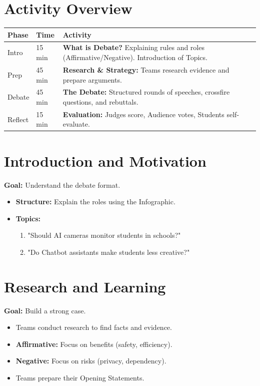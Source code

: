 \documentclass[11pt, a4paper]{article}
\begin{document}
\section*{Activity Overview}
\begingroup
\small
\begin{tabularx}{\textwidth}{|l|l|L|}
    \hline
     \textbf{Phase} & \textbf{Time} & \textbf{Activity} \\ \hline
    Intro & 15 min & \textbf{What is Debate?} Explaining rules and roles (Affirmative/Negative). Introduction of Topics. \\ \hline
    Prep & 45 min & \textbf{Research \& Strategy:} Teams research evidence and prepare arguments. \\ \hline
    Debate & 45 min & \textbf{The Debate:} Structured rounds of speeches, crossfire questions, and rebuttals. \\ \hline
    Reflect & 15 min & \textbf{Evaluation:} Judges score, Audience votes, Students self-evaluate. \\ \hline
\end{tabularx}
\endgroup

\section{Introduction and Motivation}
\textbf{Goal:} Understand the debate format.
\begin{itemize}
    \item \textbf{Structure:} Explain the roles using the Infographic.
    \item \textbf{Topics:}
    \begin{enumerate}
        \item "Should AI cameras monitor students in schools?"
        \item "Do Chatbot assistants make students less creative?"
    \end{enumerate}
\end{itemize}

\section{Research and Learning}
\textbf{Goal:} Build a strong case.
\begin{itemize}
    \item Teams conduct research to find facts and evidence.
    \item \textbf{Affirmative:} Focus on benefits (safety, efficiency).
    \item \textbf{Negative:} Focus on risks (privacy, dependency).
    \item Teams prepare their Opening Statements.
\end{itemize}
\end{document}
